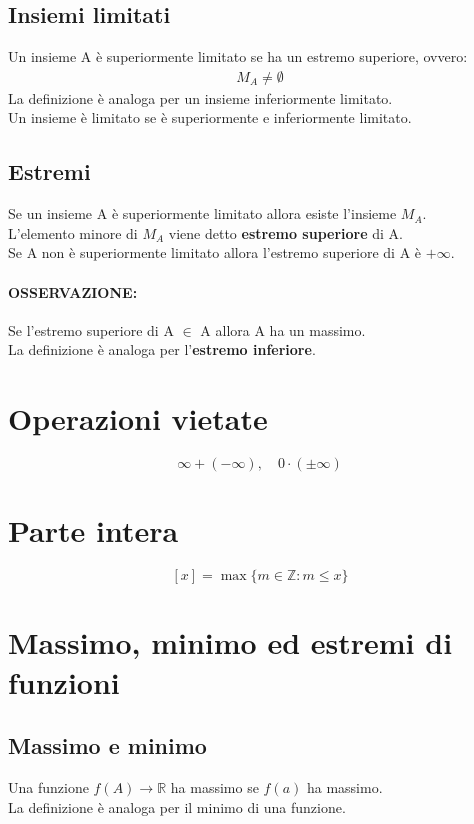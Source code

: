 \documentclass[12pt,a4paper]{article}
\let\oldsection\section
\renewcommand{\section}{\clearpage\oldsection}
\begin{document}
\subsection{Insiemi limitati}
Un insieme A è superiormente limitato se ha un estremo superiore, ovvero:
\begin{align*}
    M_A \ne \emptyset
\end{align*}
La definizione è analoga per un insieme inferiormente limitato.\\
Un insieme è limitato se è superiormente e inferiormente limitato.

\subsection{Estremi}
Se un insieme A è superiormente limitato allora esiste l'insieme $M_A$.\\
L'elemento minore di $M_A$ viene detto \textbf{estremo superiore} di A.\\
Se A non è superiormente limitato allora l'estremo superiore di A è $+\infty$.
\paragraph{OSSERVAZIONE:} Se l'estremo superiore di A $\in$ A allora A ha un massimo.\\
La definizione è analoga per l'\textbf{estremo inferiore}.

\section{Operazioni vietate}
\[
\infty + (-\infty), \quad 0 \cdot (\pm \infty)
\]

\section{Parte intera}
\[
[x] = \max \{ m \in \mathbb{Z} : m \le x \}
\]

\section{Massimo, minimo ed estremi di funzioni}

\subsection{Massimo e minimo}
Una funzione $f(A) \rightarrow \mathbb{R}$ ha massimo se $f(a)$ ha massimo.\\
La definizione è analoga per il minimo di una funzione.
\end{document}
